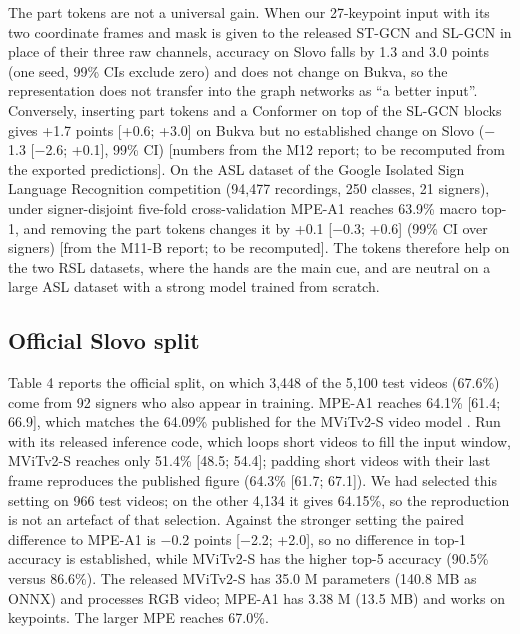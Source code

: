 \documentclass[a4paper,fleqn]{cas-dc}
\begin{document}
The part tokens are not a universal gain. When our 27-keypoint input with its two coordinate frames and mask is given to the released ST-GCN and SL-GCN in place of their three raw channels, accuracy on Slovo falls by 1.3 and 3.0 points (one seed, 99\% CIs exclude zero) and does not change on Bukva, so the representation does not transfer into the graph networks as ``a better input''. Conversely, inserting part tokens and a Conformer on top of the SL-GCN blocks gives +1.7 points {[}+0.6; +3.0{]} on Bukva but no established change on Slovo ($-$1.3 {[}$-$2.6; +0.1{]}, 99\% CI) {\color{red}[numbers from the M12 report; to be recomputed from the exported predictions]}. On the ASL dataset of the Google Isolated Sign Language Recognition competition \cite{2023_kaggle_gislr} (94,477 recordings, 250 classes, 21 signers), under signer-disjoint five-fold cross-validation MPE-A1 reaches 63.9\% macro top-1, and removing the part tokens changes it by +0.1 {[}$-$0.3; +0.6{]} (99\% CI over signers) {\color{red}[from the M11-B report; to be recomputed]}. The tokens therefore help on the two RSL datasets, where the hands are the main cue, and are neutral on a large ASL dataset with a strong model trained from scratch.

\hypertarget{official-slovo-split}{%
\subsection{Official Slovo split}\label{official-slovo-split}}

Table 4 reports the official split, on which 3,448 of the 5,100 test videos (67.6\%) come from 92 signers who also appear in training. MPE-A1 reaches 64.1\% {[}61.4; 66.9{]}, which matches the 64.09\% published for the MViTv2-S video model \cite{2023_kapitanov_slovo}. Run with its released inference code, which loops short videos to fill the input window, MViTv2-S reaches only 51.4\% {[}48.5; 54.4{]}; padding short videos with their last frame reproduces the published figure (64.3\% {[}61.7; 67.1{]}). We had selected this setting on 966 test videos; on the other 4,134 it gives 64.15\%, so the reproduction is not an artefact of that selection. Against the stronger setting the paired difference to MPE-A1 is $-$0.2 points {[}$-$2.2; +2.0{]}, so no difference in top-1 accuracy is established, while MViTv2-S has the higher top-5 accuracy (90.5\% versus 86.6\%). The released MViTv2-S has 35.0 M parameters (140.8 MB as ONNX) and processes RGB video; MPE-A1 has 3.38 M (13.5 MB) and works on keypoints. The larger MPE reaches 67.0\%.
\end{document}
